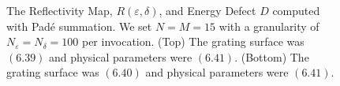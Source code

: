 \begin{figure}[H]
    \vspace{3mm}
    \caption{The Reflectivity Map, $R(\varepsilon,\delta)$, and Energy Defect $D$
    computed with Pad\'e summation. We set $N=M=15$ 
    with a granularity of $N_{\varepsilon}=N_{\delta}=100$ per invocation. (Top) The grating surface was $(6.39)$ and physical parameters were $(6.41)$. (Bottom) The grating surface was $(6.40)$ and physical parameters were $(6.41)$.}
    \label{Fig:RM:Single Case 1}
\end{figure}